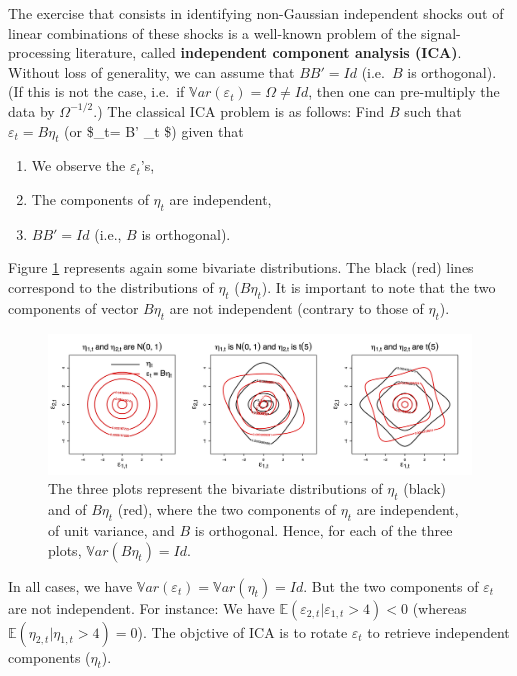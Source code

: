 \documentclass[
  12pt,
]{book}
\providecommand{\tightlist}{%
  \setlength{\itemsep}{0pt}\setlength{\parskip}{0pt}}
\theoremstyle{definition}
\theoremstyle{definition}
\theoremstyle{definition}
\theoremstyle{definition}
\theoremstyle{remark}
\begin{document}
The exercise that consists in identifying non-Gaussian independent shocks out of linear combinations of these shocks is a well-known problem of the signal-processing literature, called \textbf{independent component analysis (ICA)}. Without loss of generality, we can assume that \(BB' = Id\) (i.e.~\(B\) is orthogonal). (If this is not the case, i.e.~if \(\mathbb{V}ar(\varepsilon_t)=\Omega \ne Id\), then one can pre-multiply the data by \(\Omega^{-1/2}\).) The classical ICA problem is as follows: Find \(B\) such that \(\varepsilon_t = B \eta_t\) (or \$\eta\_t= B' \varepsilon\_t \$) given that

\begin{enumerate}
\def\labelenumi{\roman{enumi}.}
\tightlist
\item
  We observe the \(\varepsilon_t\)'s,
\item
  The components of \(\eta_t\) are independent,
\item
  \(BB'=Id\) (i.e., \(B\) is orthogonal).
\end{enumerate}

Figure \ref{fig:ThreePlots} represents again some bivariate distributions. The black (red) lines correspond to the distributions of \(\eta_t\) (\(B\eta_t\)). It is important to note that the two components of vector \(B \eta_t\) are not independent (contrary to those of \(\eta_t\)).

\begin{figure}
\includegraphics[width=0.95\linewidth]{images/Figure_E} \caption{The three plots represent the bivariate distributions of $\eta_t$ (black) and of $B\eta_t$ (red), where the two components of $\eta_t$ are independent, of unit variance, and $B$ is orthogonal. Hence, for each of the three plots, $\mathbb{V}ar(B\eta_t)=Id$.}\label{fig:ThreePlots}
\end{figure}

In all cases, we have \(\mathbb{V}ar(\varepsilon_t)=\mathbb{V}ar(\eta_t)=Id\). But the two components of \(\varepsilon_t\) are not independent. For instance: We have \(\mathbb{E}(\varepsilon_{2,t}|\varepsilon_{1,t}>4)<0\) (whereas \(\mathbb{E}(\eta_{2,t}|\eta_{1,t}>4)=0\)). The objctive of ICA is to rotate \(\varepsilon_t\) to retrieve independent components (\(\eta_t\)).
\end{document}
